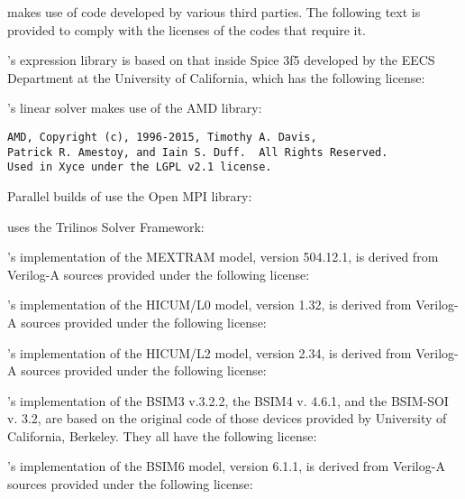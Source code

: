 \Xyce{} makes use of code developed by various third parties.  The following
text is provided to comply with the licenses of the codes that require it.

\Xyce{}'s expression library is based on that inside Spice 3f5 developed by the
EECS Department at the University of California, which has the following
license:


\Xyce{}'s linear solver makes use of the AMD library:
\begin{verbatim}
AMD, Copyright (c), 1996-2015, Timothy A. Davis,
Patrick R. Amestoy, and Iain S. Duff.  All Rights Reserved.
Used in Xyce under the LGPL v2.1 license.
\end{verbatim}

Parallel builds of \Xyce{} use the Open MPI library:


\Xyce{} uses the Trilinos Solver Framework:


\Xyce{}'s implementation of the MEXTRAM model, version 504.12.1, is derived
from Verilog-A sources provided under the following license:


\Xyce{}'s implementation of the HICUM/L0 model, version 1.32, is derived from
Verilog-A sources provided under the following license:


\Xyce{}'s implementation of the HICUM/L2 model, version 2.34, is derived from
Verilog-A sources provided under the following license:


\Xyce{}'s implementation of the BSIM3 v.3.2.2, the BSIM4 v. 4.6.1, and the
BSIM-SOI v. 3.2, are based on the original code of those devices provided by
University of California, Berkeley.  They all have the following license:


\Xyce{}'s implementation of the BSIM6 model, version 6.1.1, is derived from
Verilog-A sources provided under the following license:


